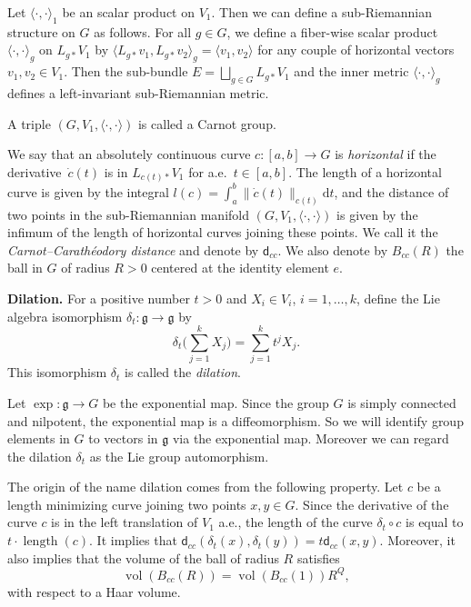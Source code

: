 \documentclass[pdftex]{sigma}
\numberwithin{equation}{section}
\newcommand{\g}{\mathfrak{g}}
\begin{document}
Let $\langle\cdot,\cdot\rangle_1$ be an scalar product on $V_1$.
Then we can define a sub-Riemannian structure on $G$ as follows.
For all $g\in G$,
we define a fiber-wise scalar product $\langle\cdot,\cdot\rangle_g$ on $L_{g\ast}V_1$ by $\langle L_{g\ast}v_1,L_{g\ast}v_2\rangle_g=\langle v_1,v_2\rangle$ for any couple of horizontal vectors $v_1,v_2\in V_1$.
Then the sub-bundle $E=\bigsqcup_{g\in G}L_{g\ast}V_1$ and the inner metric
$\langle\cdot,\cdot\rangle_g$ defines a left-invariant sub-Riemannian metric.

\begin{Definition}\label{defcarnot}
 A triple $(G,V_1,\langle\cdot,\cdot\rangle)$ is called a Carnot group.
\end{Definition}

We say that an absolutely continuous curve $c\colon[a,b]\to G$ is \textit{horizontal} if the derivative~$\dot{c}(t)$ is in $L_{c(t)\ast}V_1$ for a.e.\ $t\in[a,b]$.
The length of a horizontal curve is given by the integral $l(c)=\int_a^b\|\dot{c}(t)\|_{c(t)}\mathrm{d}t$,
and the distance of two points in the sub-Riemannian manifold $(G,V_1,\langle\cdot,\cdot\rangle)$ is given by the infimum of the length of horizontal curves joining these points.
We call it the \textit{Carnot--Carath\'eodory distance} and denote by $\mathsf{d}_{cc}$.
We also denote by $B_{cc}(R)$ the ball in $G$ of radius $R>0$ centered at the identity element $e$.

{\bf Dilation.}
For a positive number $t>0$ and $X_i\in V_i$, $i=1,\dots,k$,
define the Lie algebra isomorphism $\delta_t\colon\g\to\g$ by
\[
\delta_t\Bigg(\sum_{j=1}^kX_j\Bigg)=\sum_{j=1}^kt^jX_j.
\]
This isomorphism $\delta_t$ is called the \textit{dilation}.

Let $\exp\colon \g\to G$ be the exponential map.
Since the group $G$ is simply connected and nilpotent,
the exponential map is a diffeomorphism.
So we will identify group elements in $G$ to vectors in $\g$ via the exponential map.
Moreover we can regard the dilation $\delta_t$ as the Lie group automorphism.

The origin of the name dilation comes from the following property.
Let $c$ be a length minimizing curve joining two points $x,y\in G$.
Since the derivative of the curve $c$ is in the left translation of $V_1$ a.e.,
the length of the curve $\delta_t\circ c$ is equal to $t\cdot \operatorname{length}(c)$.
It implies that $\mathsf{d}_{cc}(\delta_t(x),\delta_t(y))=t\mathsf{d}_{cc}(x,y)$.
Moreover,
it also implies that the volume of the ball of radius $R$ satisfies
\begin{equation}\label{homogeneous}
 \operatorname{vol}(B_{cc}(R))=\operatorname{vol}(B_{cc}(1))R^Q,
\end{equation}
with respect to a Haar volume.
\end{document}
